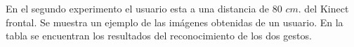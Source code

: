 En el segundo experimento el usuario esta a una distancia de $80$ $cm.$ del Kinect frontal. Se muestra un ejemplo de las imágenes obtenidas de un usuario. En la tabla se encuentran los resultados del reconocimiento de los dos gestos.   

\begin{figure}[h!]
\centering
{}

\end{figure}
